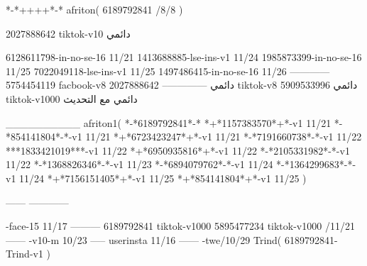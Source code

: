 *-*++++*-*
afriton(
6189792841 /8/8
)

2027888642 tiktok-v10
دائمي

6128611798-in-no-se-16 11/21
1413688885-lse-ins-v1 11/24
1985873399-in-no-se-16 11/25
7022049118-lse-ins-v1 11/25
1497486415-in-no-se-16 11/26
------------
5754454119 facbook-v8
دائمي
--------------
2027888642 tiktok-v8
دائمي
5909533996 tiktok-v1000
دائمي مع التحديث

__________
afriton1(
*-*6189792841*-*
*+*1157383570*+*-v1 11/21
*-*854141804*-*-v1 11/21
*+*6723423247*+*-v1 11/21
*-*7191660738*-*-v1 11/22
***1833421019***-v1 11/22
*+*6950935816*+*-v1 11/22
*-*2105331982*-*-v1 11/22
*-*1368826346*-*-v1 11/23
*-*6894079762*-*-v1 11/24
*-*1364299683*-*-v1 11/24
*+*7156151405*+*-v1 11/25
*+*854141804*+*-v1 11/25
)

------
------------

-face-15 11/17
---------
6189792841 tiktok-v1000
5895477234 tiktok-v1000 /11/21
------
-v10-m 10/23
-----
userinsta 11/16
------
-twe/10/29
Trind(
6189792841-Trind-v1 
)
